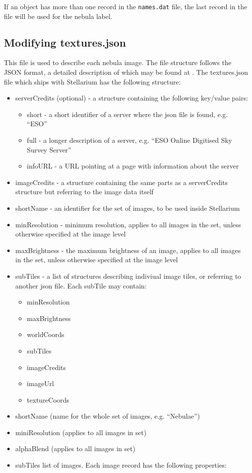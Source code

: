 If an object has more than one record in the \texttt{names.dat} file,
the last record in the file will be used for the nebula label.

\subsection{Modifying textures.json}%
\label{sec:dso:modifyingTexturesJson}

This file is used to describe each nebula image. The file structure
follows the JSON format, a detailed description of which may be found at
. The textures.json file which ships with Stellarium has the following
structure:

\begin{itemize}
\item
  serverCredits (optional) - a structure containing the following
  key/value pairs:

  \begin{itemize}
  \item
    short - a short identifier of a server where the json file is found,
    e.g. ``ESO''
  \item
    full - a longer description of a server, e.g. ``ESO Online Digitised
    Sky Survey Server''
  \item
    infoURL - a URL pointing at a page with information about the server
  \end{itemize}
\item
  imageCredits - a structure containing the same parts as a
  serverCredits structure but referring to the image data itself
\item
  shortName - an identifier for the set of images, to be used inside
  Stellarium
\item
  minResolution - minimum resolution, applies to all images in the set,
  unless otherwise specified at the image level
\item
  maxBrightness - the maximum brightness of an image, applies to all
  images in the set, unless otherwise specified at the image level
\item
  subTiles - a list of structures describing indiviual image tiles, or
  referring to another json file. Each subTile may contain:

  \begin{itemize}
  \item
    minResolution
  \item
    maxBrightness
  \item
    worldCoords
  \item
    subTiles
  \item
    imageCredits
  \item
    imageUrl
  \item
    textureCoords
  \end{itemize}
\item
  shortName (name for the whole set of images, e.g. ``Nebulae'')
\item
  miniResolution (applies to all images in set)
\item
  alphaBlend (applies to all images in set)
\item
  subTiles list of images. Each image record has the following
  properties:


\end{itemize}
